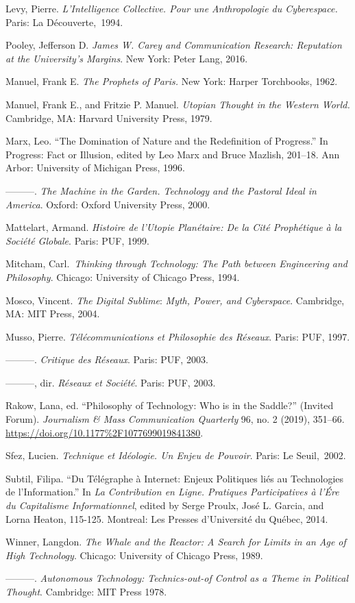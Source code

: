 \documentclass{tufte-handout}
\begin{document}
\begin{hangparas}{.25in}{1}
Levy, Pierre. \emph{L'Intelligence Collective. Pour une Anthropologie du
Cyberespace.} Paris: La Découverte,~1994.

Pooley, Jefferson D. \emph{James W. Carey and Communication Research:
Reputation at the University's Margins}. New York: Peter Lang, 2016.

Manuel, Frank E. \emph{The Prophets of Paris.} New York: Harper
Torchbooks, 1962.

Manuel, Frank E., and Fritzie P. Manuel. \emph{Utopian Thought in the
Western World.} Cambridge, MA: Harvard University Press, 1979.

Marx, Leo. ``The Domination of Nature and the Redefinition of
Progress.'' In Progress: Fact or Illusion, edited by Leo Marx and Bruce
Mazlish, 201--18. Ann Arbor: University of Michigan Press, 1996.

---------. \emph{The Machine in the Garden. Technology and the Pastoral
Ideal in America}. Oxford: Oxford University Press, 2000.

Mattelart, Armand. \emph{Histoire de l'Utopie Planétaire: De la Cité
Prophétique à la Société Globale}. Paris: PUF, 1999.

Mitcham, Carl.~\emph{Thinking through Technology: The Path between
Engineering and Philosophy}. Chicago: University of Chicago Press, 1994.

Mosco, Vincent. \emph{The} \emph{Digital Sublime}: \emph{Myth, Power,
and Cyberspace}. Cambridge, MA: MIT Press, 2004.

Musso, Pierre. \emph{Télécommunications et Philosophie des Réseaux}.
Paris: PUF, 1997.

---------. \emph{Critique des Réseaux}. Paris: PUF, 2003.

---------, dir. \emph{Réseaux et Société}. Paris: PUF, 2003.

Rakow, Lana, ed. ``Philosophy of Technology: Who is in the Saddle?''
(Invited Forum). \emph{Journalism \& Mass Communication Quarterly} 96,
no. 2 (2019), 351--66.
\url{https://doi.org/10.1177\%2F1077699019841380}.

Sfez, Lucien. \emph{Technique et Idéologie. Un Enjeu de Pouvoir}. Paris:
Le Seuil,~2002.

Subtil, Filipa. ``Du Télégraphe à Internet: Enjeux Politiques liés au
Technologies de l'Information.'' In \emph{La Contribution en Ligne.
Pratiques Participatives à l'Ére du Capitalisme Informationnel}, edited
by Serge Proulx, José L. Garcia, and Lorna Heaton, 115-125. Montreal:
Les Presses d'Université du Québec, 2014.

Winner, Langdon. \emph{The Whale and the Reactor: A Search for Limits in
an Age of High Technology}. Chicago: University of Chicago Press, 1989.

---------. \emph{Autonomous Technology: Technics-out-of Control as a
Theme in Political Thought}. Cambridge: MIT Press 1978.







\end{hangparas}
\end{document}
